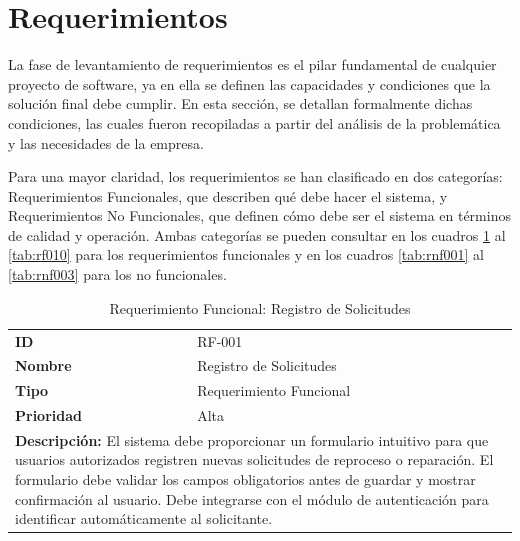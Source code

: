 \documentclass[12pt,letterpaper,spanish]{report}
\begin{document}
\section{Requerimientos}




La fase de levantamiento de requerimientos es el pilar fundamental de cualquier proyecto de software, ya en ella se definen las capacidades y condiciones que la solución final debe cumplir. En esta sección, se detallan formalmente dichas condiciones, las cuales fueron recopiladas a partir del análisis de la problemática y las necesidades de la empresa.

Para una mayor claridad, los requerimientos se han clasificado en dos categorías: Requerimientos Funcionales, que describen qué debe hacer el sistema, y Requerimientos No Funcionales, que definen cómo debe ser el sistema en términos de calidad y operación. Ambas categorías se pueden consultar en los cuadros  \ref{tab:rf001} al \ref{tab:rf010} para los requerimientos funcionales y en los cuadros \ref{tab:rnf001} al \ref{tab:rnf003} para los no funcionales.

\begin{table}[H]
    \centering
    \caption{Requerimiento Funcional: Registro de Solicitudes}
    \label{tab:rf001}
    \begin{tabular}{ll}
        \toprule
        \textbf{ID} & RF-001 \\
        \textbf{Nombre} & Registro de Solicitudes \\
        \textbf{Tipo} & Requerimiento Funcional \\
        \textbf{Prioridad} & Alta \\
        \midrule
        \multicolumn{2}{l}{
            \parbox{0.9\linewidth}{
                \textbf{Descripción:} El sistema debe proporcionar un formulario intuitivo para que usuarios autorizados registren nuevas solicitudes de reproceso o reparación. El formulario debe validar los campos obligatorios antes de guardar y mostrar confirmación al usuario. Debe integrarse con el módulo de autenticación para identificar automáticamente al solicitante.
            }
        } \\
        \bottomrule
    \end{tabular}
\end{table}
\end{document}
